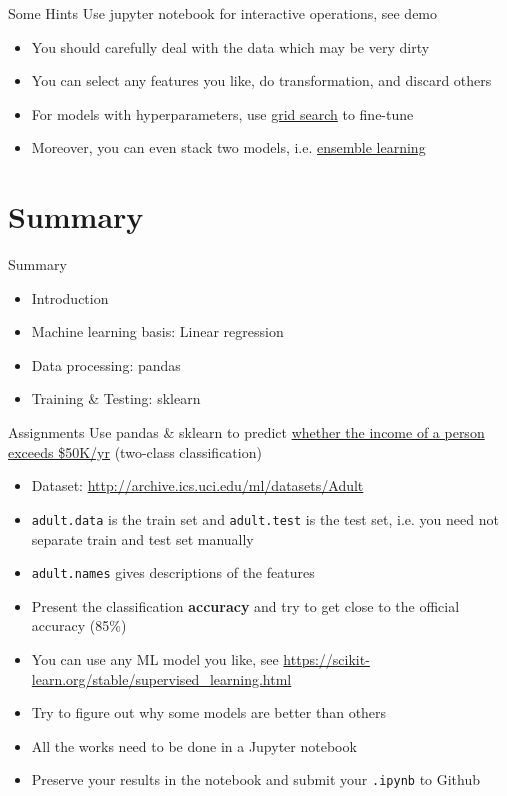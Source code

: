 \documentclass{../TexTemplate/myslide}
\begin{document}
\begin{frame}{Some Hints}
\hypertarget{hint}{}
Use jupyter notebook for interactive operations, see demo
\begin{itemize}
	\item You should carefully deal with the data which may be very dirty
	\item You can select any features you like, do transformation, and discard others
	\item For models with hyperparameters, use \href{https://scikit-learn.org/stable/modules/grid_search.html}{grid search} to fine-tune
	\item Moreover, you can even stack two models, i.e. \href{https://en.wikipedia.org/wiki/Ensemble_learning}{ensemble learning}
\end{itemize}
\end{frame}

\section{Summary}
\begin{frame}
\sectionpage
\end{frame}

\begin{frame}{Summary}
\begin{itemize}
	\item Introduction
	\item Machine learning basis: Linear regression
	\item Data processing: pandas
	\item Training \& Testing: sklearn
\end{itemize}
\end{frame}

\begin{frame}[fragile]{Assignments}
Use pandas \& sklearn to predict \underline{whether the income of a person exceeds \$50K/yr} (two-class classification)
\begin{itemize}
	\item Dataset: \url{http://archive.ics.uci.edu/ml/datasets/Adult}
	\item \verb'adult.data' is the train set and \verb'adult.test' is the test set, i.e. you need not separate train and test set manually
	\item \verb'adult.names' gives descriptions of the features
	\item Present the classification \textbf{accuracy} and try to get close to the official accuracy (85\%)
	\item You can use any ML model you like, see \url{https://scikit-learn.org/stable/supervised_learning.html}
	\item Try to figure out why some models are better than others
	\item All the works need to be done in a Jupyter notebook
	\item Preserve your results in the notebook and submit your \verb'.ipynb' to Github
\end{itemize}
\end{frame}
\end{document}
